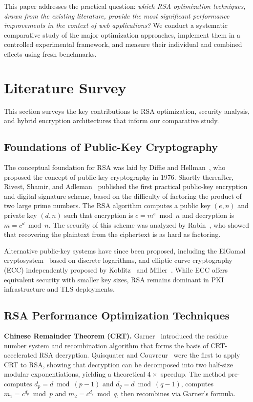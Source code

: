 \documentclass[journal]{IEEEtran}
\begin{document}
This paper addresses the practical question: \textit{which RSA optimization techniques, drawn from the existing literature, provide the most significant performance improvements in the context of web applications?} We conduct a systematic comparative study of the major optimization approaches, implement them in a controlled experimental framework, and measure their individual and combined effects using fresh benchmarks.


\section{Literature Survey}
\label{sec:litreview}

This section surveys the key contributions to RSA optimization, security analysis, and hybrid encryption architectures that inform our comparative study.

\subsection{Foundations of Public-Key Cryptography}

The conceptual foundation for RSA was laid by Diffie and Hellman~\cite{diffie1976}, who proposed the concept of public-key cryptography in 1976. Shortly thereafter, Rivest, Shamir, and Adleman~\cite{rivest1978} published the first practical public-key encryption and digital signature scheme, based on the difficulty of factoring the product of two large prime numbers. The RSA algorithm computes a public key $(e, n)$ and private key $(d, n)$ such that encryption is $c = m^e \bmod n$ and decryption is $m = c^d \bmod n$. The security of this scheme was analyzed by Rabin~\cite{rabin1979}, who showed that recovering the plaintext from the ciphertext is as hard as factoring.

Alternative public-key systems have since been proposed, including the ElGamal cryptosystem~\cite{elgamal1985} based on discrete logarithms, and elliptic curve cryptography (ECC) independently proposed by Koblitz~\cite{koblitz1987} and Miller~\cite{miller1985}. While ECC offers equivalent security with smaller key sizes, RSA remains dominant in PKI infrastructure and TLS deployments.

\subsection{RSA Performance Optimization Techniques}

\textbf{Chinese Remainder Theorem (CRT).}
Garner~\cite{garner1959} introduced the residue number system and recombination algorithm that forms the basis of CRT-accelerated RSA decryption. Quisquater and Couvreur~\cite{quisquater1982} were the first to apply CRT to RSA, showing that decryption can be decomposed into two half-size modular exponentiations, yielding a theoretical $4\times$ speedup. The method pre-computes $d_p = d \bmod (p-1)$ and $d_q = d \bmod (q-1)$, computes $m_1 = c^{d_p} \bmod p$ and $m_2 = c^{d_q} \bmod q$, then recombines via Garner's formula.
\end{document}
